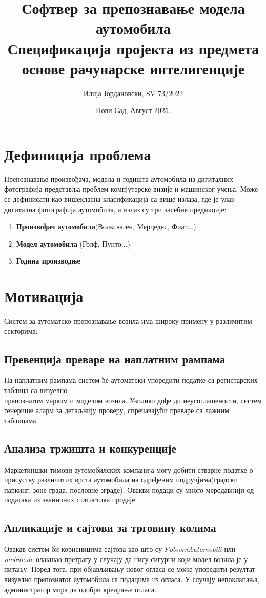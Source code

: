 \documentclass{article}
\title{%
  Софтвер за препознавање модела аутомобила \\
  \large Спецификација пројекта из предмета \\
  основе рачунарске интелигенције}
\author{Илија Јордановски, SV 73/2022}
\date{Нови Сад, Август 2025.}
\begin{document}
  \maketitle
  \newpage

  \section{Дефиниција проблема}
  Препознавање произвођача, модела и годишта аутомобила из дигиталних фотографија представља проблем компјутерске визије и машинског учења.
  Може се дефинисати као вишекласна класификација са више излаза, где је улаз дигитална фотографија аутомобила, а излаз су три засебне предикције: 
  \begin{enumerate}
    \item \textbf{Произвођач аутомобила}(Волксваген, Мерцедес, Фиат...)
    \item \textbf{Модел аутомобила} (Голф, Пунто...)
    \item \textbf{Година производње}
  \end{enumerate}

  \section{Мотивација}
  Систем за аутоматско препознавање возила има широку примену у различитим секторима:
  \subsection*{Превенција преваре на наплатним рампама}
  На наплатним рампама систем ће аутоматски упоредити податке са регистарских таблица са визуелно \\
  препознатом марком и моделом возила. Уколико дође до неусоглашености, 
  систем генерише аларм за детаљнију проверу, спречавајући преваре са лажним таблицама.
  \subsection*{Анализа тржишта и конкуренције}
  Маркетиншки тимови аутомобилских компанија могу добити стварне податке о присуству различитих врста аутомобила на одређеним подручјима(градски паркинг, зоне града, пословне зграде). 
  Овакви подаци су много меродавнији од података из званичних статистика продаје.
  \subsection*{Апликације и сајтови за трговину колима}
  Овакав систем би корисницима сајтова као што су \textit{PolovniAutomobili} или \textit{mobile.de} олакшао претрагу у случају да нису сигурни који модел возила је у питању.
  Поред тога, при објављивању новог огласа се може упоредити резултат визуелно препознатог аутомобила са подацима из огласа. У случају непоклапања, администратор мора да одобри креирање огласа.
\end{document}
